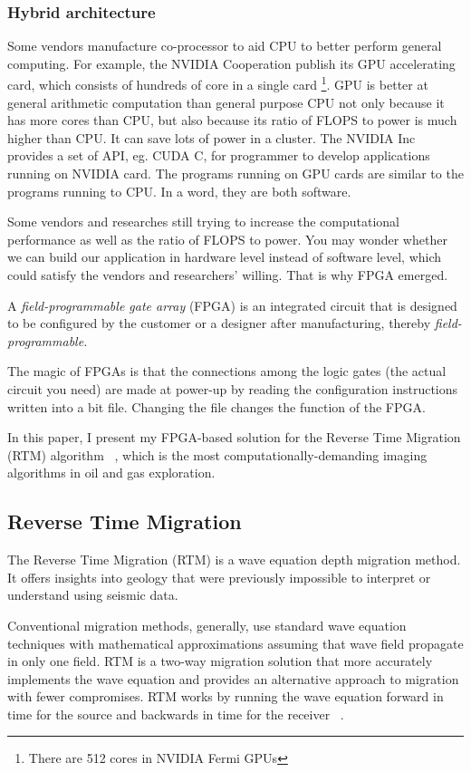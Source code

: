 \subsubsection{Hybrid architecture}
Some vendors manufacture co-processor to aid CPU to better perform
general computing. For example, the NVIDIA Cooperation publish its
GPU accelerating card, which consists of hundreds of core in a single
card \footnote{There are 512 cores in NVIDIA Fermi GPUs}. GPU is better at general arithmetic
computation than general purpose CPU not only because it has more
cores than CPU, but also because its ratio of FLOPS  to power is much
higher than CPU. It can save lots of power in a cluster. The NVIDIA Inc
provides a set of
API, eg. CUDA C, for programmer to develop applications running on
NVIDIA card. The programs running on GPU cards are similar to the
programs running to CPU. In a word, they are both software.

Some vendors and researches still trying to increase the computational
performance as well as the ratio of FLOPS to power. You may wonder
whether we can build our application in hardware level instead of
software level, which could satisfy the vendors and researchers' willing.
That is why FPGA emerged.

A \emph {field-programmable gate array} (FPGA) is an integrated
circuit that is designed to be configured by the customer or a designer
after manufacturing, thereby \emph {field-programmable.}

The magic of FPGAs is that the connections among the logic gates (the
actual circuit you need) are made at power-up by reading the configuration
instructions written into a bit file. Changing the file changes the
function of the FPGA.

In this paper, I present my FPGA-based solution for the Reverse Time
Migration (RTM) algorithm ~\cite{yoon03}, which is the most computationally-demanding
imaging algorithms in oil and gas exploration.

\subsection{Reverse Time Migration}
The Reverse Time Migration (RTM) is a wave equation depth migration
method. It offers insights into geology that were previously impossible
to interpret or understand using seismic data.

Conventional migration methods, generally, use standard wave equation
techniques with mathematical approximations assuming that wave field
propagate in only one field. RTM is a two-way migration solution that
more accurately implements the wave equation and provides an alternative
approach to migration with fewer compromises. RTM works by running
the wave equation forward in time for the source and backwards in
time for the receiver ~\cite{shafiq}.


